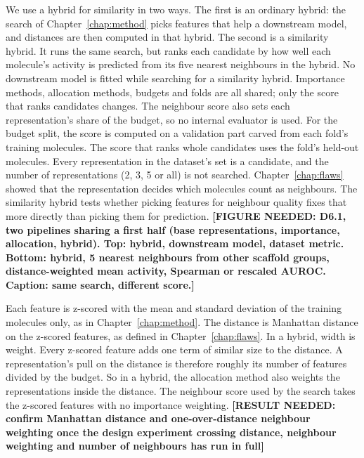We use a hybrid for similarity in two ways. The first is an ordinary hybrid: the search of Chapter~\ref{chap:method} picks features that help a downstream model, and distances are then computed in that hybrid. The second is a similarity hybrid. It runs the same search, but ranks each candidate by how well each molecule's activity is predicted from its five nearest neighbours in the hybrid. No downstream model is fitted while searching for a similarity hybrid. Importance methods, allocation methods, budgets and folds are all shared; only the score that ranks candidates changes. The neighbour score also sets each representation's share of the budget, so no internal evaluator is used. For the budget split, the score is computed on a validation part carved from each fold's training molecules. The score that ranks whole candidates uses the fold's held-out molecules. Every representation in the dataset's set is a candidate, and the number of representations (2, 3, 5 or all) is not searched. Chapter~\ref{chap:flaws} showed that the representation decides which molecules count as neighbours. The similarity hybrid tests whether picking features for neighbour quality fixes that more directly than picking them for prediction. \textbf{[FIGURE NEEDED: D6.1, two pipelines sharing a first half (base representations, importance, allocation, hybrid). Top: hybrid, downstream model, dataset metric. Bottom: hybrid, 5 nearest neighbours from other scaffold groups, distance-weighted mean activity, Spearman or rescaled AUROC. Caption: same search, different score.]}

Each feature is z-scored with the mean and standard deviation of the training molecules only, as in Chapter~\ref{chap:method}. The distance is Manhattan distance on the z-scored features, as defined in Chapter~\ref{chap:flaws}. In a hybrid, width is weight. Every z-scored feature adds one term of similar size to the distance. A representation's pull on the distance is therefore roughly its number of features divided by the budget. So in a hybrid, the allocation method also weights the representations inside the distance. The neighbour score used by the search takes the z-scored features with no importance weighting. \textbf{[RESULT NEEDED: confirm Manhattan distance and one-over-distance neighbour weighting once the design experiment crossing distance, neighbour weighting and number of neighbours has run in full]}

